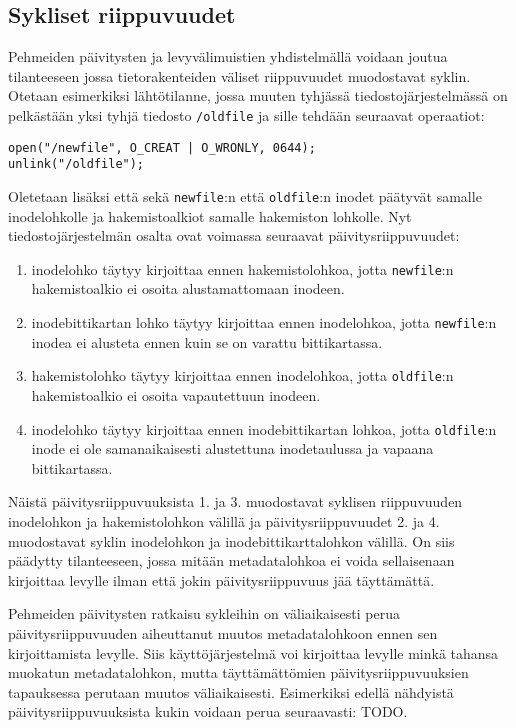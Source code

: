 \subsection{Sykliset riippuvuudet}
Pehmeiden päivitysten ja levyvälimuistien yhdistelmällä voidaan joutua tilanteeseen jossa tietorakenteiden väliset riippuvuudet muodostavat syklin.
Otetaan esimerkiksi lähtötilanne,
jossa muuten tyhjässä tiedostojärjestelmässä on pelkästään yksi tyhjä tiedosto \texttt{/oldfile} ja sille tehdään seuraavat operaatiot:
%
\begin{verbatim}
open("/newfile", O_CREAT | O_WRONLY, 0644);
unlink("/oldfile");
\end{verbatim}
%
Oletetaan lisäksi että sekä \texttt{newfile}:n että \texttt{oldfile}:n inodet päätyvät samalle inodelohkolle ja hakemistoalkiot samalle hakemiston lohkolle.
Nyt tiedostojärjestelmän osalta ovat voimassa seuraavat päivitysriippuvuudet:
\begin{enumerate}
    \item{inodelohko täytyy kirjoittaa ennen hakemistolohkoa, jotta \texttt{newfile}:n hakemistoalkio ei osoita alustamattomaan inodeen.}
    \item{inode\-bitti\-kartan lohko täytyy kirjoittaa ennen inode\-lohkoa, jotta \texttt{newfile}:n inodea ei alusteta ennen kuin se on varattu bittikartassa.}
    \item{hakemisto\-lohko täytyy kirjoittaa ennen inode\-lohkoa, jotta \texttt{oldfile}:n hakemisto\-alkio ei osoita vapautettuun inodeen.}
    \item{inode\-lohko täytyy kirjoittaa ennen inode\-bitti\-kartan lohkoa, jotta \texttt{oldfile}:n inode ei ole samanaikaisesti alustettuna inodetaulussa ja vapaana bitti\-kartassa.}
\end{enumerate}
Näistä päivitysriippuvuuksista 1. ja 3. muodostavat syklisen riippuvuuden inodelohkon ja hakemistolohkon välillä ja päivitysriippuvuudet 2. ja 4. muodostavat syklin inodelohkon ja inodebittikarttalohkon välillä.
On siis päädytty tilanteeseen, jossa mitään metadatalohkoa ei voida sellaisenaan kirjoittaa levylle ilman että jokin päivitysriippuvuus jää täyttämättä.

Pehmeiden päivitysten ratkaisu sykleihin on väliaikaisesti perua päivitysriippuvuuden aiheuttanut muutos metadatalohkoon ennen sen kirjoittamista levylle.
Siis käyttöjärjestelmä voi kirjoittaa levylle minkä tahansa muokatun metadatalohkon,
mutta täyttämättömien päivitysriippuvuuksien tapauksessa perutaan muutos väliaikaisesti.
Esimerkiksi edellä nähdyistä päivitysriippuvuuksista kukin voidaan perua seuraavasti: TODO.

